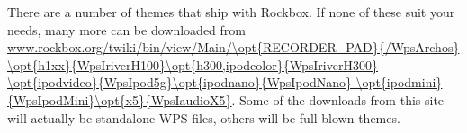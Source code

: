 There are a number of themes that ship with Rockbox.  If none of
these suit your needs, many more can be downloaded from 
\url{www.rockbox.org/twiki/bin/view/Main/\opt{RECORDER_PAD}{/WpsArchos}
\opt{h1xx}{WpsIriverH100}\opt{h300,ipodcolor}{WpsIriverH300}
\opt{ipodvideo}{WpsIpod5g}\opt{ipodnano}{WpsIpodNano}
\opt{ipodmini}{WpsIpodMini}\opt{x5}{WpsIaudioX5}}. 
Some of the downloads from this site will actually be standalone WPS files, 
others will be full-blown themes. 


